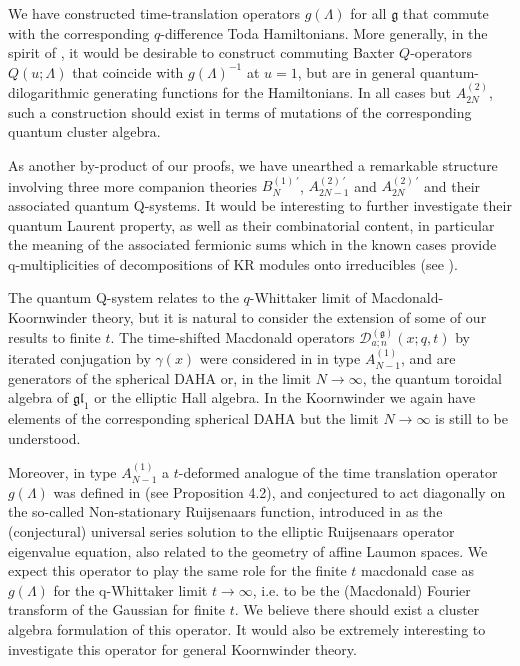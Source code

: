 \documentclass[12pt]{amsart}
\newcommand{\g}{{\mathfrak{g}}}
\newcommand{\lL}{{\Lambda}}
\numberwithin{equation}{section}
\begin{document}
We have constructed time-translation operators $g(\lL)$ for all $\g$ that commute with the corresponding $q$-difference Toda Hamiltonians. More generally, in the spirit of \cite{SS}, it would be desirable to construct commuting Baxter $Q$-operators $Q(u;\lL)$ 
that coincide with $g(\lL)^{-1}$ at $u=1$, but are in general quantum-dilogarithmic generating functions for the Hamiltonians. In all cases but 
$A_{2N}^{(2)}$, such a construction should exist in terms of mutations of the corresponding quantum cluster algebra.

As another by-product of our proofs, we have unearthed a remarkable structure involving three more
companion theories $B_N^{(1)\,'}$, $A_{2N-1}^{(2)\,'}$ and $A_{2N}^{(2)\,'}$ and their associated quantum
Q-systems. It would be interesting to further investigate their quantum Laurent property, as well as their combinatorial content, in particular the meaning of the associated fermionic sums which in the known cases provide q-multiplicities of decompositions of KR modules onto irreducibles (see \cite{krKR,DFK15}).


The quantum Q-system relates to the $q$-Whittaker limit of Macdonald-Koornwinder theory, but it is natural to consider the extension of some of our results to finite $t$. The time-shifted Macdonald operators $\mathcal D^{(\g)}_{a;n}(x;q,t)$ by iterated conjugation by $\gamma(x) $ were considered in \cite{DFKqt} in type $A_{N-1}^{(1)}$, and are generators of the spherical DAHA or, in the limit $N\to\infty$, the quantum toroidal algebra of $\mathfrak{gl}_1$ or the elliptic Hall algebra.
In the Koornwinder we again have elements of the corresponding spherical DAHA but the limit $N\to\infty$ is still to be understood. 

Moreover, in type $A_{N-1}^{(1)}$ a $t$-deformed analogue of the time translation operator $g(\lL)$ was defined in \cite{Langmann} (see Proposition 4.2),
and conjectured to act diagonally on the so-called Non-stationary Ruijsenaars function, introduced in \cite{ShiraishiLaumon} as the (conjectural) universal series solution to the elliptic Ruijsenaars operator eigenvalue equation, also related to the geometry of affine Laumon spaces. We expect this operator to play the same role for the finite $t$ macdonald case as $g(\Lambda)$ for the q-Whittaker limit $t\to\infty$, i.e. to be the (Macdonald) Fourier transform of the Gaussian for finite $t$. 
We believe there should exist a cluster algebra formulation of this operator.
It would also be extremely interesting to investigate this operator for general Koornwinder theory.
\end{document}
